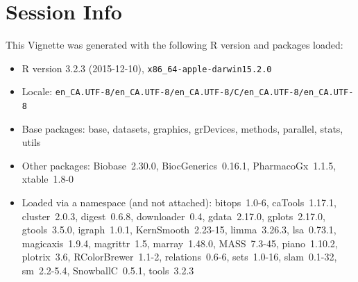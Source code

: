 \documentclass[11pt]{article}
\begin{document}
\section*{Session Info}

This Vignette was generated with the following R version and packages loaded:

\begin{itemize}\raggedright
  \item R version 3.2.3 (2015-12-10), \verb|x86_64-apple-darwin15.2.0|
  \item Locale: \verb|en_CA.UTF-8/en_CA.UTF-8/en_CA.UTF-8/C/en_CA.UTF-8/en_CA.UTF-8|
  \item Base packages: base, datasets, graphics, grDevices, methods,
    parallel, stats, utils
  \item Other packages: Biobase~2.30.0, BiocGenerics~0.16.1,
    PharmacoGx~1.1.5, xtable~1.8-0
  \item Loaded via a namespace (and not attached): bitops~1.0-6,
    caTools~1.17.1, cluster~2.0.3, digest~0.6.8, downloader~0.4,
    gdata~2.17.0, gplots~2.17.0, gtools~3.5.0, igraph~1.0.1,
    KernSmooth~2.23-15, limma~3.26.3, lsa~0.73.1, magicaxis~1.9.4,
    magrittr~1.5, marray~1.48.0, MASS~7.3-45, piano~1.10.2,
    plotrix~3.6, RColorBrewer~1.1-2, relations~0.6-6, sets~1.0-16,
    slam~0.1-32, sm~2.2-5.4, SnowballC~0.5.1, tools~3.2.3
\end{itemize}


\end{document}
